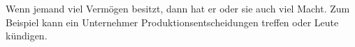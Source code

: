 Wenn jemand viel Vermögen besitzt, dann hat er oder sie auch viel Macht.
Zum Beispiel kann ein Unternehmer Produktionsentscheidungen treffen oder Leute kündigen.